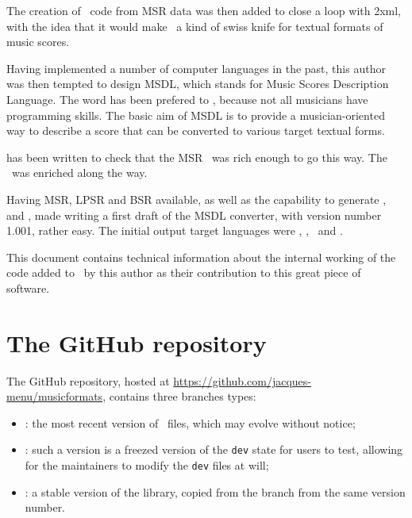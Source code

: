 The creation of \mxml\ code from MSR data was then added to close a loop with \mxml2xml, with the idea that it would make \mf\ a kind of swiss knife for textual formats of music scores.

Having implemented a number of computer languages in the past, this author was then tempted to design MSDL, which stands for Music Scores Description Language. The word  has been prefered to , because not all musicians have programming skills.
The basic aim of MSDL is to provide a musician-oriented way to describe a score that can be converted to various target textual forms.

 has been written to check that the MSR \API\ was rich enough to go this way. The \API\ was enriched along the way.

Having MSR, LPSR and BSR available, as well as the capability to generate \mxml, \lily\, \guido and \braille, made writing a first draft of the MSDL converter, with version number 1.001, rather easy. The initial output target languages were \mxml, \lily, \mxml\ and \braille.

This document contains technical information about the internal working of the code added to \mf\ by this author as their contribution to this great piece of software.


\section{The GitHub repository}

The GitHub repository, hosted at \url{https://github.com/jacques-menu/musicformats}, contains three branches types:
\begin{itemize}
\item {} : the most recent version of \mf\ files, which may evolve without notice;
\item {} : such a version is a freezed version of the {\tt dev} state for users to test, allowing for the maintainers to modify the {\tt dev} files at will;
\item {} : a stable version of the library, copied from the  branch from the same version number.
\end{itemize}
